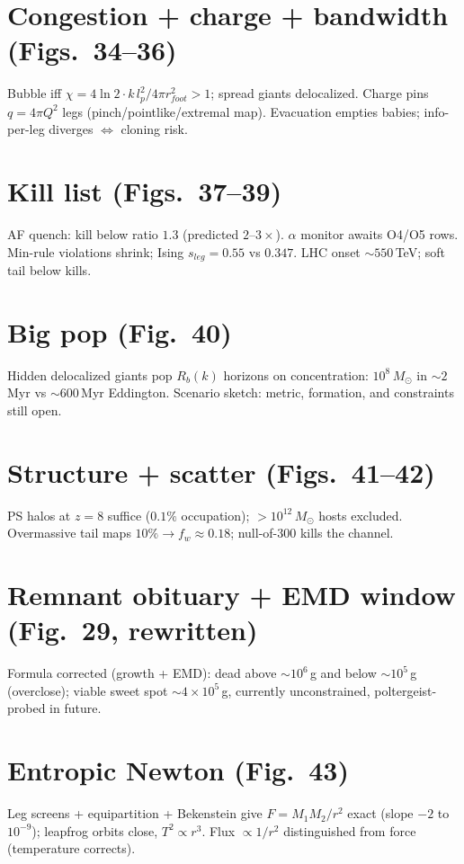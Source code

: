 \documentclass[11pt]{article}
\begin{document}
\section{Congestion + charge + bandwidth (Figs.~34--36)}
Bubble iff $\chi=4\ln2\cdot k\,l_p^2/4\pi r_{foot}^2>1$; spread giants delocalized.
Charge pins $q=4\pi Q^2$ legs (pinch/pointlike/extremal map). Evacuation
empties babies; info-per-leg diverges $\iff$ cloning risk.

\section{Kill list (Figs.~37--39)}
AF quench: kill below ratio $1.3$ (predicted $2$--$3\times$). $\alpha$
monitor awaits O4/O5 rows. Min-rule violations shrink; Ising $s_{leg}=0.55$
vs $0.347$. LHC onset $\sim550$\,TeV; soft tail below kills.

\section{Big pop (Fig.~40)}
Hidden delocalized giants pop $R_b(k)$ horizons on concentration:
$10^8\,M_\odot$ in $\sim2$\,Myr vs $\sim600$\,Myr Eddington. Scenario
sketch: metric, formation, and constraints still open.

\section{Structure + scatter (Figs.~41--42)}
PS halos at $z=8$ suffice ($0.1\%$ occupation); $>10^{12}\,M_\odot$ hosts
excluded. Overmassive tail maps $10\%\to f_w\approx0.18$; null-of-300
kills the channel.

\section{Remnant obituary + EMD window (Fig.~29, rewritten)}
Formula corrected (growth + EMD): dead above $\sim10^6$\,g and below
$\sim10^5$\,g (overclose); viable sweet spot $\sim4\times10^5$\,g,
currently unconstrained, poltergeist-probed in future.

\section{Entropic Newton (Fig.~43)}
Leg screens + equipartition + Bekenstein give $F=M_1M_2/r^2$ exact
(slope $-2$ to $10^{-9}$); leapfrog orbits close, $T^2\propto r^3$.
Flux $\propto1/r^2$ distinguished from force (temperature corrects).
\end{document}
